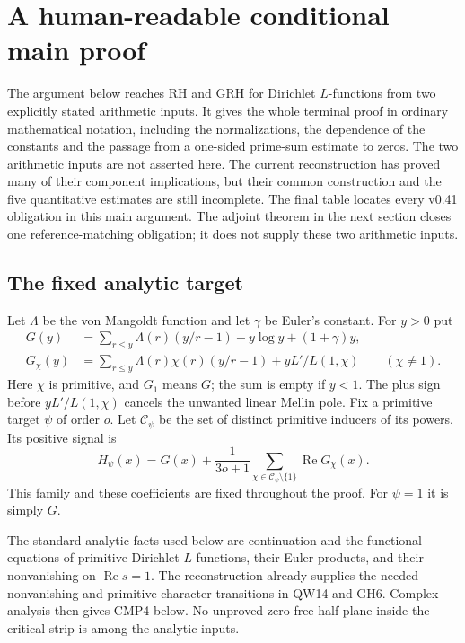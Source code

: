 \section{A human-readable conditional main proof}
\label{sec:conditional-main-v42}

The argument below reaches RH and GRH for Dirichlet $L$-functions
from two explicitly stated arithmetic inputs.  It gives the whole
terminal proof in ordinary mathematical notation, including the
normalizations, the dependence of the constants and the passage from
a one-sided prime-sum estimate to zeros.  The two arithmetic inputs
are not asserted here.  The current reconstruction has proved many
of their component implications, but their common construction and
the five quantitative estimates are still incomplete.  The final
table locates every v0.41 obligation in this main argument.  The
adjoint theorem in the next section closes one reference-matching
obligation; it does not supply these two arithmetic inputs.

\subsection{The fixed analytic target}

Let $\Lambda$ be the von Mangoldt function and let $\gamma$ be
Euler's constant.  For $y>0$ put
\begin{align*}
 G(y)&=\sum_{r\le y}\Lambda(r)(y/r-1)
                         -y\log y+(1+\gamma)y,\\
 G_\chi(y)&=\sum_{r\le y}\Lambda(r)\chi(r)(y/r-1)
                         +yL'/L(1,\chi)\qquad(\chi\ne1).
\end{align*}
Here $\chi$ is primitive, and $G_1$ means $G$; the sum is empty
if $y<1$.  The plus sign before $yL'/L(1,\chi)$ cancels the
unwanted linear Mellin pole.  Fix a primitive target $\psi$ of
order $o$.  Let $\mathcal C_\psi$ be the set of distinct primitive
inducers of its powers.  Its positive signal is
\[
 H_\psi(x)=G(x)+\frac1{3o+1}
             \sum_{\chi\in\mathcal C_\psi\setminus\{1\}}
                                      \operatorname{Re}G_\chi(x).
 \tag{CMP.1}
\]
This family and these coefficients are fixed throughout the proof.
For $\psi=1$ it is simply $G$.

The standard analytic facts used below are continuation and the
functional equations of primitive Dirichlet $L$-functions, their
Euler products, and their nonvanishing on $\operatorname{Re}s=1$.
The reconstruction already supplies the needed nonvanishing and
primitive-character transitions in QW14 and GH6.  Complex analysis
then gives CMP4 below.  No unproved zero-free half-plane inside the
critical strip is among the analytic inputs.

